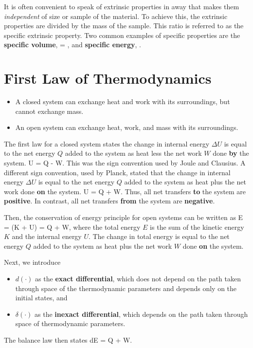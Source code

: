 It is often convenient to speak of extrinsic properties in away that makes
them {\em independent} of size or sample of the material.  
To achieve this, the
extrinsic properties are divided by the mass of the sample. 
This ratio is referred to 
as the specific extrinsic property.  
Two common examples of specific properties
are the {\bf specific volume},
\be
\svol {} {} = ,
\label{eq:specific_volume}
\ee
and
{\bf specific energy},
\be
\senergy {} {}.
\ee


\section{First Law of Thermodynamics}
\begin{itemize}
\item A closed system can exchange heat and work
with its surroundings, but cannot exchange mass.

\item An open system can exchange heat, work, and mass with its surroundings.
\end{itemize}

The first law for a closed system states the change in internal
energy $\Delta U$ is equal to the net energy $Q$ added to the system as heat
less the net work $W$ done {\bf by} the system.
\be
\Delta U = Q - W.
\ee
This was the sign convention used by Joule and Clausius.
A different sign convention, used by Planck, stated that 
the change in internal energy $\Delta U$ is equal to the net energy $Q$
added to the system as heat plus the net work done {\bf on} the system.
\be
\Delta U = Q + W.
\ee
Thus, all net transfers {\bf to} the system are {\bf positive}.  In 
contrast, all net transfers {\bf from} the system are {\bf negative}.

Then, the conservation of energy principle for open systems can be
written as
\be
\Delta E = \Delta (K + U) = Q + W,
\ee
where the total energy $E$ is the sum of the kinetic energy $K$ and 
the internal energy $U$.
The change in total energy is equal to the net energy $Q$ added to the system
as heat plus the net work $W$ done {\bf on} the system.

Next, we introduce
\begin{itemize}
\item $d(\cdot)$ as the {\bf exact differential}, which does not depend on the 
path taken through space of the thermodynamic parameters and depends only
on the initial states, and
\item $\delta(\cdot)$ as the {\bf inexact differential}, which depends on the
path taken through space of thermodynamic parameters.
\end{itemize}
The balance law then states
\be
dE = \delta Q + \delta W.
\ee

